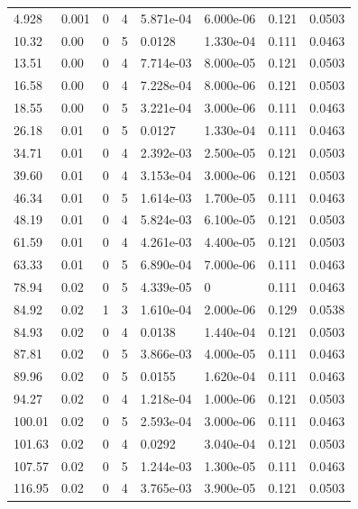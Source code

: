 \documentclass[preview]{standalone}
\begin{document}
{{\begin{tabular}{L{1.2cm}C{1.2cm} C{0.3cm}C{0.5cm} C{1.4cm}C{1.4cm} C{1.4cm}C{1.4cm}}
  4.928  &  0.001  & 0     &  4 &  5.871e-04  & 6.000e-06  & 0.121 &  0.0503   \\ 
  10.32  &  0.00  & 0     &  5 &  0.0128  & 1.330e-04  & 0.111 &  0.0463   \\ 
  13.51  &  0.00  & 0     &  4 &  7.714e-03  & 8.000e-05  & 0.121 &  0.0503   \\ 
  16.58  &  0.00  & 0     &  4 &  7.228e-04  & 8.000e-06  & 0.121 &  0.0503   \\ 
  18.55  &  0.00  & 0     &  5 &  3.221e-04  & 3.000e-06  & 0.111 &  0.0463   \\ 
  26.18  &  0.01  & 0     &  5 &  0.0127  & 1.330e-04  & 0.111 &  0.0463   \\ 
  34.71  &  0.01  & 0     &  4 &  2.392e-03  & 2.500e-05  & 0.121 &  0.0503   \\ 
  39.60  &  0.01  & 0     &  4 &  3.153e-04  & 3.000e-06  & 0.121 &  0.0503   \\ 
  46.34  &  0.01  & 0     &  5 &  1.614e-03  & 1.700e-05  & 0.111 &  0.0463   \\ 
  48.19  &  0.01  & 0     &  4 &  5.824e-03  & 6.100e-05  & 0.121 &  0.0503   \\ 
  61.59  &  0.01  & 0     &  4 &  4.261e-03  & 4.400e-05  & 0.121 &  0.0503   \\ 
  63.33  &  0.01  & 0     &  5 &  6.890e-04  & 7.000e-06  & 0.111 &  0.0463   \\ 
  78.94  &  0.02  & 0     &  5 &  4.339e-05  & 0  & 0.111 &  0.0463   \\ 
  84.92  &  0.02  & 1     &  3 &  1.610e-04  & 2.000e-06  & 0.129 &  0.0538   \\ 
  84.93  &  0.02  & 0     &  4 &  0.0138  & 1.440e-04  & 0.121 &  0.0503   \\ 
  87.81  &  0.02  & 0     &  5 &  3.866e-03  & 4.000e-05  & 0.111 &  0.0463   \\ 
  89.96  &  0.02  & 0     &  5 &  0.0155  & 1.620e-04  & 0.111 &  0.0463   \\ 
  94.27  &  0.02  & 0     &  4 &  1.218e-04  & 1.000e-06  & 0.121 &  0.0503   \\ 
  100.01  &  0.02  & 0     &  5 &  2.593e-04  & 3.000e-06  & 0.111 &  0.0463   \\ 
  101.63  &  0.02  & 0     &  4 &  0.0292  & 3.040e-04  & 0.121 &  0.0503   \\ 
  107.57  &  0.02  & 0     &  5 &  1.244e-03  & 1.300e-05  & 0.111 &  0.0463   \\ 
  116.95  &  0.02  & 0     &  4 &  3.765e-03  & 3.900e-05  & 0.121 &  0.0503   \\ 

\end{tabular}}}
\end{document}
